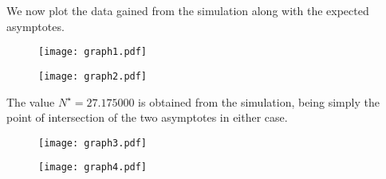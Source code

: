 \documentclass[12pt]{article}
\begin{document}
We now plot the data gained from the simulation along with the expected asymptotes. 
\newcommand*{\ShowIntersection}{
	\fill 
	[name intersections={of=GraphCurve and HorizontalLine, name=i, total=\t}] 
	[red, opacity=1, every node/.style={above left, black, opacity=1}] 
	\foreach \s in {1,...,\t}{(i-\s) circle (2pt)
		node [above left] {\s}};
}
\begin{figure}[H]
	\centering
	\texttt{[image: graph1.pdf]}
\end{figure}
\begin{figure}[H]
	\centering
	\texttt{[image: graph2.pdf]}
\end{figure}
The value $N^{\star}=27.175000$ is obtained from the simulation, being simply the point of intersection of the two asymptotes in either case.
\begin{figure}[H]
	\centering
	\texttt{[image: graph3.pdf]}
\end{figure}
\begin{figure}[H]
	\centering
	\texttt{[image: graph4.pdf]}
\end{figure}
\end{document}
